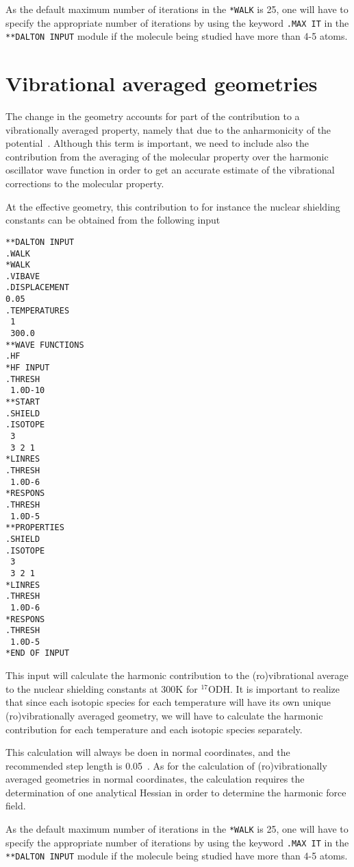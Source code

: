 As the default maximum number of iterations in the \verb|*WALK| is 25,
one will have to specify the appropriate number of iterations by using
the keyword \verb|.MAX IT| in the \verb|**DALTON INPUT| module if the
molecule being studied have more than 4-5 atoms.

\section{Vibrational averaged
geometries}\label{sec:vibavegeo}

The change in the geometry accounts for part of the contribution to a
vibrationally averaged property, namely that due to the anharmonicity
of the potential~\cite{krpoaprtjacs123}. Although this term is important, we need to
include also the contribution from the averaging of the molecular
property over the harmonic oscillator wave function in order to get an
accurate estimate of the vibrational corrections to the molecular
property. 

At the effective geometry, this contribution to for instance the
nuclear shielding constants can be obtained from the following input
\begin{verbatim}
**DALTON INPUT
.WALK
*WALK
.VIBAVE
.DISPLACEMENT
0.05
.TEMPERATURES
 1
 300.0
**WAVE FUNCTIONS
.HF
*HF INPUT
.THRESH
 1.0D-10
**START
.SHIELD
.ISOTOPE
 3
 3 2 1
*LINRES
.THRESH
 1.0D-6
*RESPONS
.THRESH
 1.0D-5
**PROPERTIES
.SHIELD
.ISOTOPE
 3
 3 2 1
*LINRES
.THRESH
 1.0D-6
*RESPONS
.THRESH
 1.0D-5
*END OF INPUT
\end{verbatim}

This input will calculate the harmonic contribution to the
(ro)vibrational average to the nuclear shielding constants at 300K for
$^{17}$ODH. It is important to realize that since each isotopic
species for each temperature will have its own unique
(ro)vibrationally averaged geometry, we will have to calculate the
harmonic contribution for each temperature and each isotopic species
separately. 

This calculation will always be doen in normal coordinates, and the
recommended step length is 0.05~\cite{krpoaprtjcp112}. As for the calculation of
(ro)vibrationally averaged geometries in normal coordinates, the
calculation requires the determination of one analytical Hessian in
order to determine the harmonic force field.

As the default maximum number of iterations in the \verb|*WALK| is 25,
one will have to specify the appropriate number of iterations by using
the keyword \verb|.MAX IT| in the \verb|**DALTON INPUT| module if the
molecule being studied have more than 4-5 atoms.

